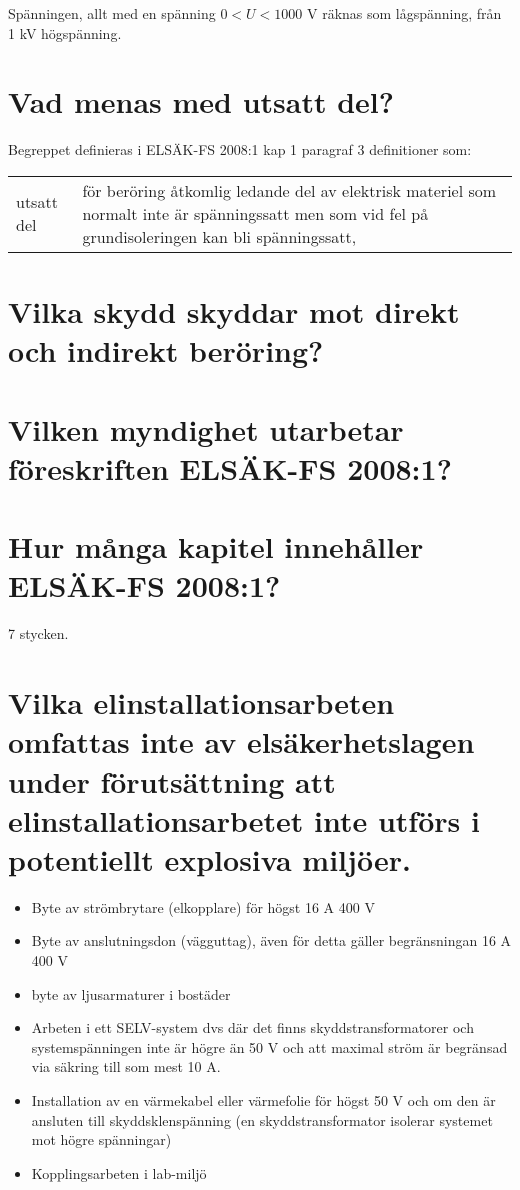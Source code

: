 \documentclass[a4paper,swedish]{article}
\begin{document}
Spänningen, allt med en spänning $0 < U <1000$ V räknas som lågspänning, från 1 kV högspänning.

\setcounter{section}{59}
\section{Vad menas med utsatt del?}

Begreppet definieras i ELSÄK-FS 2008:1 kap 1 paragraf 3 definitioner som:

\begin{center}
  \begin{tabular}{|l p{10cm}|}
    utsatt del & för beröring åtkomlig ledande del av elektrisk materiel
                 som normalt inte är spänningssatt men som vid fel på
                 grundisoleringen kan bli spänningssatt,
  \end{tabular}
\end{center}

\setcounter{section}{61}
\section{Vilka skydd skyddar mot direkt och indirekt beröring?}

\setcounter{section}{63}
\section{Vilken myndighet utarbetar föreskriften ELSÄK-FS 2008:1?}

\setcounter{section}{65}
\section{Hur många kapitel innehåller ELSÄK-FS 2008:1?}

7 stycken.

\setcounter{section}{67}
\section{Vilka elinstallationsarbeten omfattas inte av elsäkerhetslagen under förutsättning att elinstallationsarbetet inte utförs i potentiellt explosiva miljöer.}

\begin{itemize}
\item Byte av strömbrytare (elkopplare) för högst 16 A 400 V
\item Byte av anslutningsdon (vägguttag), även för detta gäller begränsningan 16 A 400 V
\item byte av ljusarmaturer i bostäder
\item Arbeten i ett SELV-system dvs där det finns skyddstransformatorer och systemspänningen inte är högre än 50 V
  och att maximal ström är begränsad via säkring till som mest 10 A.
\item Installation av en värmekabel eller värmefolie för högst 50 V och om den är ansluten till skyddsklenspänning (en skyddstransformator isolerar systemet mot högre spänningar)
\item Kopplingsarbeten i lab-miljö
\end{itemize}
\end{document}
